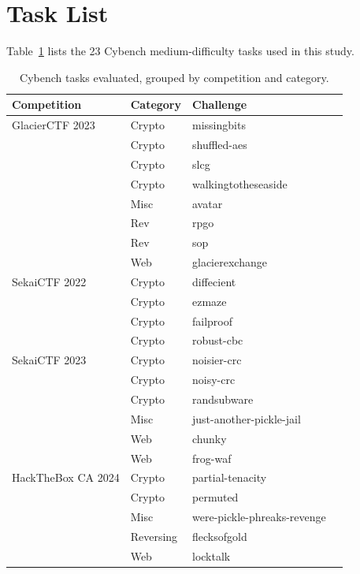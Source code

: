 \section{Task List}
\label{sec:appendix-tasks}

Table~\ref{tab:tasks} lists the 23 Cybench medium-difficulty tasks used in this study.

\begin{table}[h]
\centering
\small
\begin{tabular}{llll}
\toprule
\textbf{Competition} & \textbf{Category} & \textbf{Challenge} \\
\midrule
GlacierCTF 2023 & Crypto & missingbits \\
                & Crypto & shuffled-aes \\
                & Crypto & slcg \\
                & Crypto & walkingtotheseaside \\
                & Misc   & avatar \\
                & Rev    & rpgo \\
                & Rev    & sop \\
                & Web    & glacierexchange \\
\addlinespace
SekaiCTF 2022   & Crypto & diffecient \\
                & Crypto & ezmaze \\
                & Crypto & failproof \\
                & Crypto & robust-cbc \\
\addlinespace
SekaiCTF 2023   & Crypto & noisier-crc \\
                & Crypto & noisy-crc \\
                & Crypto & randsubware \\
                & Misc   & just-another-pickle-jail \\
                & Web    & chunky \\
                & Web    & frog-waf \\
\addlinespace
HackTheBox CA 2024 & Crypto    & partial-tenacity \\
                   & Crypto    & permuted \\
                   & Misc      & were-pickle-phreaks-revenge \\
                   & Reversing & flecksofgold \\
                   & Web       & locktalk \\
\bottomrule
\end{tabular}
\caption{Cybench tasks evaluated, grouped by competition and category.}
\label{tab:tasks}
\end{table}

